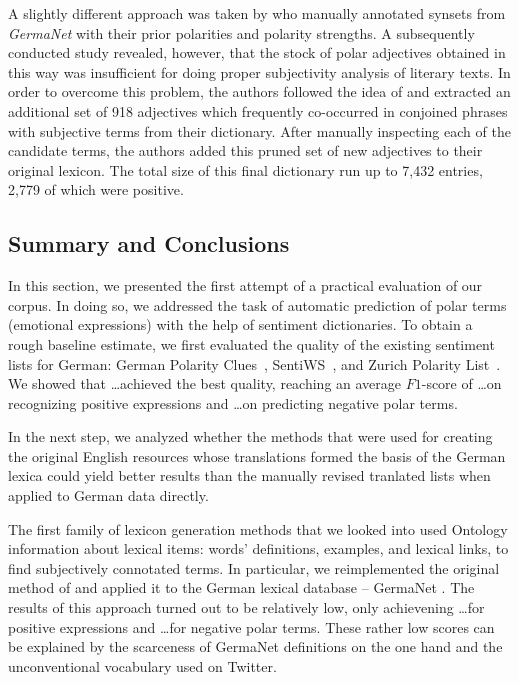 A slightly different approach was taken by \citet{Clematide:10} who
manually annotated synsets from \emph{GermaNet} \cite{Hamp:97} with
their prior polarities and polarity strengths.  A subsequently
conducted study revealed, however, that the stock of polar adjectives
obtained in this way was insufficient for doing proper subjectivity
analysis of literary texts.  In order to overcome this problem, the
authors followed the idea of \citet{Hatzivassi:97} and extracted an
additional set of 918 adjectives which frequently co-occurred in
conjoined phrases with subjective terms from their dictionary.  After
manually inspecting each of the candidate terms, the authors added
this pruned set of new adjectives to their original lexicon.  The
total size of this final dictionary run up to 7,432 entries, 2,779 of
which were positive.

\subsection{Summary and Conclusions}

In this section, we presented the first attempt of a practical
evaluation of our corpus.  In doing so, we addressed the task of
automatic prediction of polar terms (emotional expressions) with the
help of sentiment dictionaries.  To obtain a rough baseline estimate,
we first evaluated the quality of the existing sentiment lists for
German: German Polarity Clues~\cite{Waltinger:10},
SentiWS~\cite{Remus:10}, and Zurich Polarity List~\cite{Clematide:10}.
We showed that \ldots achieved the best quality, reaching an average
$F1$-score of \ldots on recognizing positive expressions and \ldots on
predicting negative polar terms.

In the next step, we analyzed whether the methods that were used for
creating the original English resources whose translations formed the
basis of the German lexica could yield better results than the
manually revised tranlated lists when applied to German data directly.

The first family of lexicon generation methods that we looked into
used Ontology information about lexical items: words' definitions,
examples, and lexical links, to find subjectively connotated terms.
In particular, we reimplemented the original method of
\citet{Esuli:06b} and applied it to the German lexical database --
GermaNet \cite{Hamp:97}.  The results of this approach turned out to
be relatively low, only achievening \ldots for positive expressions
and \ldots for negative polar terms.  These rather low scores can be
explained by the scarceness of GermaNet definitions on the one hand
and the unconventional vocabulary used on Twitter.

